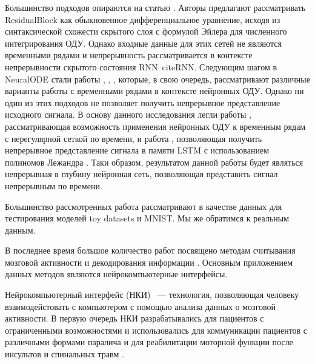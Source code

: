 \documentclass[12pt]{article}
\begin{document}
Большинство подходов опираются на статью \cite{neural_ode}. Авторы предлагают рассматривать ResidualBlock \cite{ResNet} как обыкновенное дифференциальное уравнение, исходя из синтаксической схожести скрытого слоя с формулой Эйлера для численного интегрирования ОДУ. Однако входные данные для этих сетей не являются временными рядами и непрерывность рассматривается в контексте непрерывности скрытого состояния RNN\ cite{RNN}.
Следующим шагом в NeuralODE стали работы \cite{cde}, \cite{latentode}, \cite{ode2vae}, которые, в свою очередь, рассматривают различные варианты работы с временными рядами в контексте нейронных ОДУ. Однако ни один из этих подходов не позволяет получить непрерывное представление исходного сигнала. 
В основу данного исследования легли работы \cite{cde}, рассматривающая возможность применения нейронных ОДУ к временным рядам с нерегулярной сеткой по времени, и работа \cite{lmu}, позволяющая получить непрерывное представление сигнала в памяти LSTM \cite{LSTM} с использованием полиномов Лежандра \cite{legendre_polynom}. Таки образом, результатом данной работы будет являться непрерывная в глубину нейронная сеть, позволяющая представить сигнал непрерывным по времени.

Большинство рассмотренных работа рассматривают в качестве данных для тестирования моделей toy datasets и MNIST\cite{mnist}. Мы же обратимся к реальным данным.

В последнее время большое количество работ посвящено методам считывания мозговой активности и декодирования информации \cite{Hu2018,Song2017,Loza2017,Eliseyev2016,Gaglianese2016,Bundy2016,Morishita2014}. Основным приложением данных методов являются нейрокомпьютерные интерфейсы.

Нейрокомпьютерный интерфейс (НКИ) ~--- технология, позволяющая человеку взаимодейстовать с компьютером с помощью анализа данных о мозговой активности. 
В первую очередь НКИ разрабатывались для пациентов с ограниченными возможностями и использовались для коммуникации пациентов с различными формами паралича и для реабилитации моторной функции после инсультов и спинальных травм \cite{chaudhary2020neuropsychological}.
\end{document}
